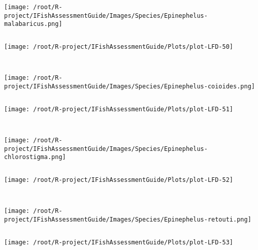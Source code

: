 \documentclass{report}\usepackage[]{graphicx}\usepackage[]{color}
\makeatletter
\def\maxwidth{ %
  \ifdim\Gin@nat@width>\linewidth
    \linewidth
  \else
    \Gin@nat@width
  \fi
}
\newenvironment{kframe}{%
 \def\at@end@of@kframe{}%
 \ifinner\ifhmode%
  \def\at@end@of@kframe{\end{minipage}}%
  \begin{minipage}{\columnwidth}%
 \fi\fi%
 \def\FrameCommand##1{\hskip\@totalleftmargin \hskip-\fboxsep
 \colorbox{shadecolor}{##1}\hskip-\fboxsep
     \hskip-\linewidth \hskip-\@totalleftmargin \hskip\columnwidth}%
 \MakeFramed {\advance\hsize-\width
   \@totalleftmargin\z@ \linewidth\hsize
   \@setminipage}}%
 {\par\unskip\endMakeFramed%
 \at@end@of@kframe}
\newenvironment{knitrout}{}{} %
\makeatother
\begin{document}
\begin{knitrout}
\begin{kframe}
\begin{verbatim}
\end{verbatim}
\end{kframe}
\texttt{[image: /root/R-project/IFishAssessmentGuide/Images/Species/Epinephelus-malabaricus.png]}
\begin{kframe}\begin{verbatim}
\end{verbatim}
\end{kframe}
\texttt{[image: /root/R-project/IFishAssessmentGuide/Plots/plot-LFD-50]} 
\begin{kframe}\begin{verbatim}
 
\end{verbatim}
\end{kframe}
\texttt{[image: /root/R-project/IFishAssessmentGuide/Images/Species/Epinephelus-coioides.png]}
\begin{kframe}\begin{verbatim}
\end{verbatim}
\end{kframe}
\texttt{[image: /root/R-project/IFishAssessmentGuide/Plots/plot-LFD-51]} 
\begin{kframe}\begin{verbatim}
 
\end{verbatim}
\end{kframe}
\texttt{[image: /root/R-project/IFishAssessmentGuide/Images/Species/Epinephelus-chlorostigma.png]}
\begin{kframe}\begin{verbatim}
\end{verbatim}
\end{kframe}
\texttt{[image: /root/R-project/IFishAssessmentGuide/Plots/plot-LFD-52]} 
\begin{kframe}\begin{verbatim}
 
\end{verbatim}
\end{kframe}
\texttt{[image: /root/R-project/IFishAssessmentGuide/Images/Species/Epinephelus-retouti.png]}
\begin{kframe}\begin{verbatim}
\end{verbatim}
\end{kframe}
\texttt{[image: /root/R-project/IFishAssessmentGuide/Plots/plot-LFD-53]} 
\begin{kframe}\begin{verbatim}
 

\end{verbatim}
\end{kframe}
\end{knitrout}
\end{document}
